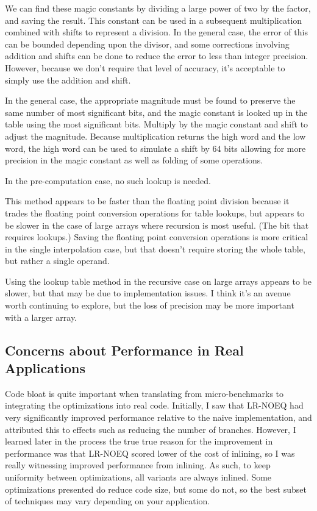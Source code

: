 \documentclass{article}
\begin{document}
We can find these magic constants by dividing a large power of two by the factor, and saving the result. This constant can be used in a subsequent multiplication combined with shifts to represent a division. In the general case, the error of this can be bounded depending upon the divisor, and some corrections involving addition and shifts can be done to reduce the error to less than integer precision. However, because we don’t require that level of accuracy, it’s acceptable to simply use the addition and shift.

In the general case, the appropriate magnitude must be found to preserve the same number of most significant bits, and the magic constant is looked up in the table using the most significant bits. Multiply by the magic constant and shift to adjust the magnitude. Because multiplication returns the high word and the low word, the high word can be used to simulate a shift by 64 bits allowing for more precision in the magic constant as well as folding of some operations.

In the pre-computation case, no such lookup is needed.

This method appears to be faster than the floating point division because it trades the floating point conversion operations for table lookups, but appears to be slower in the case of large arrays where recursion is most useful. (The bit that requires lookups.) Saving the floating point conversion operations is more critical in the single interpolation case, but that doesn’t require storing the whole table, but rather a single operand.

Using the lookup table method in the recursive case on large arrays appears to be slower, but that may be due to implementation issues. I think it’s an avenue worth continuing to explore, but the loss of precision may be more important with a larger array. 

\subsection{Concerns about Performance in Real Applications}
Code bloat is quite important when translating from micro-benchmarks to integrating the optimizations into real code. Initially, I saw that LR-NOEQ had very significantly improved performance relative to the naive implementation, and attributed this to effects such as reducing the number of branches. However, I learned later in the process the true true reason for the improvement in performance was that LR-NOEQ scored lower of the cost of inlining, so I was really witnessing improved performance from inlining. As such, to keep uniformity between optimizations, all variants are always inlined. Some optimizations presented do reduce code size, but some do not, so the best subset of techniques may vary depending on your application.
\end{document}
